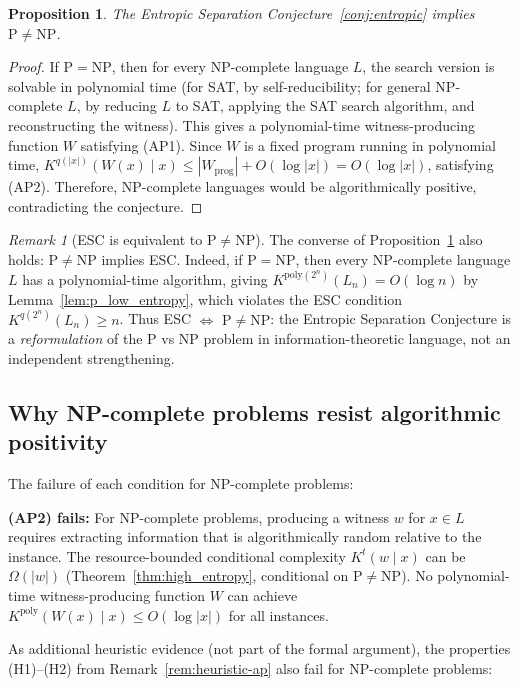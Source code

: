 \documentclass[aps,prd,twocolumn,superscriptaddress,nofootinbib]{revtex4-2}
\newtheorem{proposition}[theorem]{Proposition}
\theoremstyle{definition}
\theoremstyle{remark}
\newtheorem{remark}[theorem]{Remark}
\DeclareMathOperator{\poly}{poly}
\newcommand{\NP}{\mathrm{NP}}
\newcommand{\PP}{\mathrm{P}}
\begin{document}
\begin{proposition}
\label{prop:equiv}
The Entropic Separation Conjecture~\ref{conj:entropic} implies $\PP \neq \NP$.
\end{proposition}

\begin{proof}
If $\PP = \NP$, then for every NP-complete language $L$, the search version is solvable in polynomial time (for SAT, by self-reducibility; for general NP-complete $L$, by reducing $L$ to SAT, applying the SAT search algorithm, and reconstructing the witness). This gives a polynomial-time witness-producing function $W$ satisfying (AP1). Since $W$ is a fixed program running in polynomial time, $K^{q(|x|)}(W(x) \mid x) \leq |W_{\text{prog}}| + O(\log|x|) = O(\log|x|)$, satisfying (AP2). Therefore, NP-complete languages would be algorithmically positive, contradicting the conjecture.
\end{proof}

\begin{remark}[ESC is equivalent to $\PP \neq \NP$]
\label{rem:esc-equivalence}
The converse of Proposition~\ref{prop:equiv} also holds: $\PP \neq \NP$ implies ESC. Indeed, if $\PP = \NP$, then every NP-complete language $L$ has a polynomial-time algorithm, giving $K^{\mathrm{poly}(2^n)}(L_n) = O(\log n)$ by Lemma~\ref{lem:p_low_entropy}, which violates the ESC condition $K^{q(2^n)}(L_n) \geq n$. Thus ESC $\Leftrightarrow$ $\PP \neq \NP$: the Entropic Separation Conjecture is a \textit{reformulation} of the P vs NP problem in information-theoretic language, not an independent strengthening.
\end{remark}

\subsection{Why NP-complete problems resist algorithmic positivity}

The failure of each condition for NP-complete problems:

\textbf{(AP2) fails:} For NP-complete problems, producing a witness $w$ for $x \in L$ requires extracting information that is algorithmically random relative to the instance. The resource-bounded conditional complexity $K^t(w \mid x)$ can be $\Omega(|w|)$ (Theorem~\ref{thm:high_entropy}, conditional on $\PP \neq \NP$). No polynomial-time witness-producing function $W$ can achieve $K^{\poly}(W(x) \mid x) \leq O(\log|x|)$ for all instances.

As additional heuristic evidence (not part of the formal argument), the properties (H1)--(H2) from Remark~\ref{rem:heuristic-ap} also fail for NP-complete problems:
\end{document}
